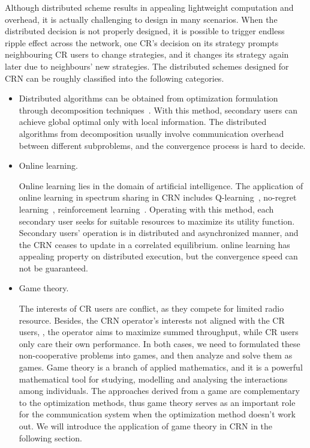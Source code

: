 Although distributed scheme results in appealing lightweight computation and overhead, it is actually challenging to design in many scenarios.
When the distributed decision is not properly designed, it is possible to trigger endless ripple effect across the network, \ie one CR's decision on its strategy prompts neighbouring CR users to change strategies, and it changes its strategy again later due to neighbours' new strategies.
%
The distributed schemes designed for CRN can be roughly classified into the following categories.
\begin{itemize}
\item Distributed algorithms can be obtained from optimization formulation through decomposition techniques~\cite{Palomar06atutorial}.
With this method, secondary users can achieve global optimal only with local information.
The distributed algorithms from decomposition usually involve communication overhead between different subproblems, and the convergence process is hard to decide.



\item Online learning.

Online learning lies in the domain of artificial intelligence. 
The application of online learning in spectrum sharing in CRN includes Q-learning~\cite{reinforcement_learning_crn_wcnc_2013}, no-regret learning~\cite{hart00correlatedeq,qlearning_huang}, reinforcement learning~\cite{reinforcement_learning_crn_2011}.
Operating with this method, each secondary user seeks for suitable resources to maximize its utility function.
Secondary users' operation is in distributed and asynchronized manner, and the CRN ceases to update in a correlated equilibrium.
online learning has appealing property on distributed execution, but the convergence speed can not be guaranteed.

\item Game theory.

The interests of CR users are conflict, as they compete for limited radio resource.
Besides, the CRN operator's interests not aligned with the CR users, \eg, the operator aims to maximize summed throughput, while CR users only care their own performance.
In both cases, we need to formulated these non-cooperative problems into games, and then analyze and solve them as games.
Game theory is a branch of applied mathematics, and it is a powerful mathematical tool for studying, modelling and analysing the interactions among individuals.
The approaches derived from a game are complementary to the optimization methods, thus game theory serves as an important role for the communication system when the optimization method doesn't work out.
We will introduce the application of game theory in CRN in the following section.

\end{itemize}

